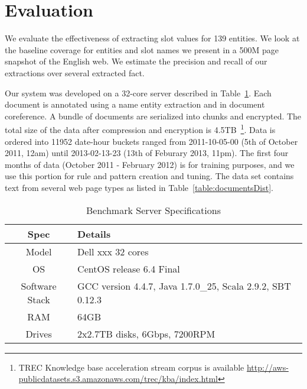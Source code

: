 
\section{Evaluation}
\label{sec:results}

We evaluate the effectiveness of extracting slot values for 139 entities.
We look at the baseline coverage for entities and slot names we present in a 500M page snapshot of the English web.
We estimate the precision and recall of our extractions over several extracted fact. 

Our system was developed on a 32-core server described in Table~\ref{table:serverspec}.
Each document is annotated using a name entity extraction and in document coreference.
A bundle of documents are serialized into chunks and encrypted.
The total size of the data after compression and encryption is 4.5TB~\footnote{TREC Knowledge base acceleration stream corpus is available  \url{http://aws-publicdatasets.s3.amazonaws.com/trec/kba/index.html}}.
Data is ordered into 11952 date-hour buckets ranged from 2011-10-05-00 (5th of October 2011, 12am)
until 2013-02-13-23 (13th of Feburary 2013, 11pm).
The first four months of data (October 2011 - February 2012) is for training purposes, 
and we use this portion for rule and pattern creation and tuning.
The data set contains text from several web page types as listed in Table~\ref{table:documentsDist}.
 
\begin{table}
\caption{Benchmark Server Specifications}
\centering
\label{table:serverspec}
\begin{tabular}{| c | p{4.8cm} |}
\hline 
\textbf{Spec} & \textbf{Details} \\ \hline
Model & Dell xxx 32 cores \\ \hline 
OS & CentOS release 6.4 Final \\ \hline 
Software Stack & GCC version 4.4.7, Java 1.7.0\_25, Scala 2.9.2, SBT 0.12.3 \\ \hline 
 RAM & 64GB\\ \hline 
 Drives & 2x2.7TB disks, 6Gbps, 7200RPM\\ \hline 
\end{tabular} 
\end{table}
 
